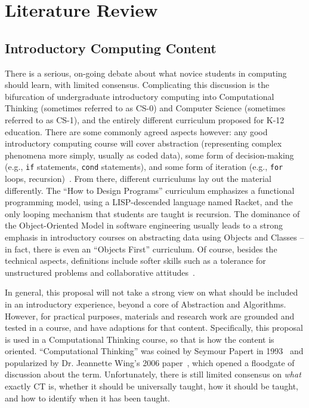\section{Literature Review}



\subsection{Introductory Computing Content}

There is a serious, on-going debate about what novice students in computing should learn, with limited consensus. 
Complicating this discussion is the bifurcation of undergraduate introductory computing into Computational Thinking (sometimes referred to as CS-0) and Computer Science (sometimes referred to as CS-1), and the entirely different curriculum proposed for K-12 education.
There are some commonly agreed aspects however: any good introductory computing course will cover abstraction (representing complex phenomena more simply, usually as coded data), some form of decision-making (e.g., \texttt{if} statements, \texttt{cond} statements), and some form of iteration (e.g., \texttt{for} loops, recursion)~\cite{Kramer:2007, CS2013, csta-computational-thinking}.
From there, different curriculums lay out the material differently.
The ``How to Design Programs'' curriculum emphasizes a functional programming model, using a LISP-descended language named Racket, and the only looping mechanism that students are taught is recursion.
The dominance of the Object-Oriented Model in software engineering usually leads to a strong emphasis in introductory courses on abstracting data using Objects and Classes -- in fact, there is even an ``Objects First'' curriculum.
Of course, besides the technical aspects, definitions include softer skills such as a tolerance for unstructured problems and collaborative attitudes~\cite{csta-computational-thinking, google-computational-thinking}.

In general, this proposal will not take a strong view on what should be included in an introductory experience, beyond a core of Abstraction and Algorithms.
However, for practical purposes, materials and research work are grounded and tested in a course, and have adaptions for that content.
Specifically, this proposal is used in a Computational Thinking course, so that is how the content is oriented.
``Computational Thinking'' was coined by Seymour Papert in 1993~\cite{papert1996} and popularized by Dr. Jeannette Wing's 2006 paper~\cite{wing2006}, which opened a floodgate of discussion about the term. 
Unfortunately, there is still limited consensus on \textit{what} exactly CT is, whether it should be universally taught, how it should be taught, and how to identify when it has been taught.

